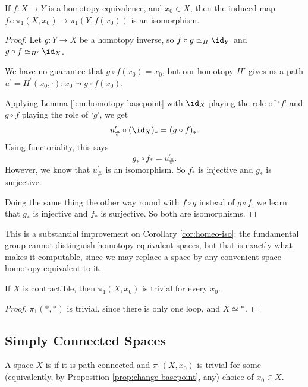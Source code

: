 \begin{theorem} \label{thm:he-iso}
	If $f: X \rightarrow Y$ is a homotopy equivalence, and $x_0 \in X$, then the induced map
	$f_*: \pi_1(X, x_0) \rightarrow \pi_1(Y, f(x_0))$ is an isomorphism.
\end{theorem}
\begin{proof}
	Let $g: Y \rightarrow X$ be a homotopy inverse, so $f \circ g \simeq_H \id_Y$ and $g \circ f \simeq_{H^{\prime}} \id_X$.

	We have no guarantee that $g \circ f(x_0)=x_0$, but our homotopy $H'$ gives us a path $u^{\prime}=H^{\prime}(x_0, \cdot): x_0 \leadsto g \circ f(x_0)$.

	Applying Lemma \ref{lem:homotopy-basepoint} with $\id_X$ playing the role of `$f$' and $g \circ f$ playing the role of `$g$', we get
	$$
	u_{\#}^{\prime} \circ(\id_X)_*=(g \circ f)_*.
	$$
	Using functoriality, this says
	$$
	g_* \circ f_*=u_{\#}^{\prime}.
	$$
	However, we know that $u_{\#}^{\prime}$ is an isomorphism. So $f_*$ is injective and $g_*$ is surjective.

	Doing the same thing the other way round with $f \circ g$ instead of $g \circ f$, we learn that $g_*$ is injective and $f_*$ is surjective. So both are isomorphisms.
\end{proof}

This is a substantial improvement on Corollary \ref{cor:homeo-iso}: the fundamental group
cannot distinguish homotopy equivalent spaces, but that is exactly what makes it
computable, since we may replace a space by any convenient space homotopy equivalent to
it.

\begin{corollary}
	If $X$ is contractible, then $\pi_1(X, x_0)$ is trivial for every $x_0$.
\end{corollary}
\begin{proof}
	$\pi_1(*, *)$ is trivial, since there is only one loop, and $X \simeq *$.
\end{proof}

\subsection{Simply Connected Spaces}

\begin{definition}
	A space $X$ is  if it is path connected and $\pi_1(X, x_0)$ is trivial for some (equivalently, by Proposition \ref{prop:change-basepoint}, any) choice of $x_0 \in X$.
\end{definition}

